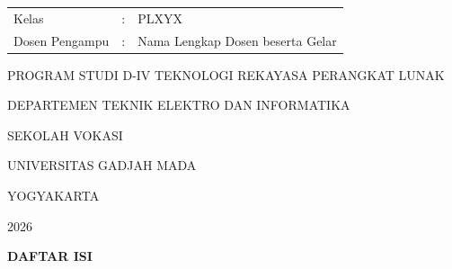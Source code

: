 \documentclass[letterpaper]{article}
\begin{document}
\begin{titlepage}
\begin{center}
{\begin{tabular}{@{}lll@{}}
                Kelas
                 & : &
                PLXYX                                \\

                Dosen Pengampu
                 & : &
                Nama Lengkap Dosen beserta Gelar
            \end{tabular}
        }


        \vfill

        {\fontsize{14pt}{16pt}\selectfont
            PROGRAM STUDI D-IV TEKNOLOGI REKAYASA PERANGKAT LUNAK

            \vspace{0.25cm}

            DEPARTEMEN TEKNIK ELEKTRO DAN INFORMATIKA

            \vspace{0.25cm}

            SEKOLAH VOKASI

            \vspace{0.25cm}

            UNIVERSITAS GADJAH MADA

            \vspace{0.25cm}

            YOGYAKARTA

            \vspace{0.25cm}

            2026
        }

    \end{center}

    \thispagestyle{empty}

\end{titlepage}


\setcounter{page}{2}


\begin{center}
    \large\textbf{DAFTAR ISI}
\end{center}

\vspace{0.5cm}
\end{document}
